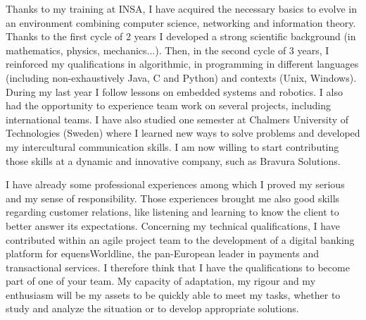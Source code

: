 \documentclass[11pt, a4paper]{awesome-cv}
\begin{document}
\begin{cvletter}
\vspace{1mm} %

Thanks to my training at INSA, I have acquired the necessary basics to evolve in an environment combining computer science, networking and information theory. Thanks to the first cycle of 2 years I developed a strong scientific background (in mathematics, physics, mechanics...). Then, in the second cycle of 3 years, I reinforced my qualifications in algorithmic, in programming in different languages (including non-exhaustively Java, C and Python) and contexts (Unix, Windows). During my last year I follow lessons on embedded systems and robotics. I also had the opportunity to experience team work on several projects, including international teams. I have also studied one semester at Chalmers University of Technologies (Sweden) where I learned new ways to solve problems and developed my intercultural communication skills. 
I am now willing to start contributing those skills at a dynamic and innovative company, such as Bravura Solutions.%


\vspace{1mm} 

I have already some professional experiences among which I proved my serious and my sense of responsibility. Those experiences brought me also good skills regarding customer relations, like listening and learning to know the client to better answer its expectations. Concerning my technical qualifications, I have contributed within an agile project team to the development of a digital banking platform for equensWorldline, the pan-European leader in payments and transactional services. I therefore think that I have the qualifications to become part of one of your team. My capacity of adaptation, my rigour and my enthusiasm will be my assets to be quickly able to meet my tasks, whether to study and analyze the situation or to develop appropriate solutions. 




\end{cvletter}


\makeletterclosing
\end{document}
